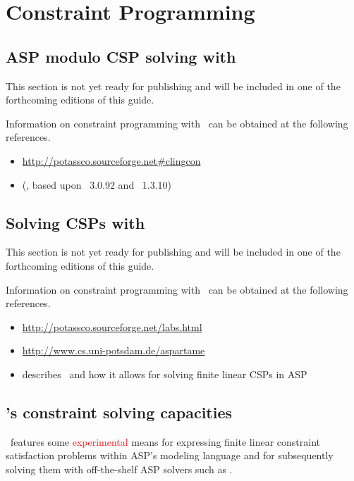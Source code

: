 \section{Constraint Programming}\label{sec:constraint}

\subsection{ASP modulo CSP solving with \clingcon}
\label{sec:clingcon}

This section is not yet ready for publishing
and will be included in one of the forthcoming editions of this guide.

Information on constraint programming with \clingcon\ can be obtained at the following references.

\begin{itemize}
\item \url{http://potassco.sourceforge.net#clingcon}
\item \cite{geossc09a,ostsch12a} (\clingcon, based upon \gringo~3.0.92 and \clasp~1.3.10)
\end{itemize}

\subsection{Solving CSPs with \aspartame}
\label{sec:aspartame}

This section is not yet ready for publishing
and will be included in one of the forthcoming editions of this guide.

Information on constraint programming with \aspartame\ can be obtained at the following references.

\begin{itemize}
\item \url{http://potassco.sourceforge.net/labs.html}
\item \url{http://www.cs.uni-potsdam.de/aspartame}
\item \cite{bageinscsotawe13a} describes \aspartame\ and how it allows for solving finite linear CSPs in ASP
\end{itemize}

\subsection{\gringo's constraint solving capacities}

\gringo\ features some \textcolor{red}{experimental} means for expressing finite linear constraint satisfaction problems within ASP's modeling language and
for subsequently solving them with off-the-shelf ASP solvers such as \clasp.

